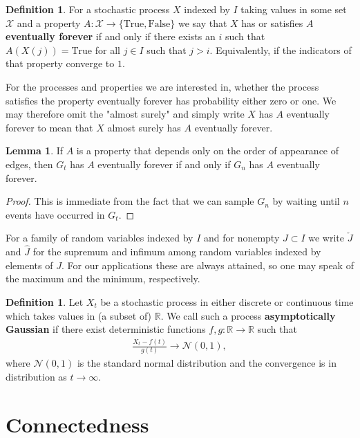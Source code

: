 \documentclass[12pt]{article}
\theoremstyle{definition}
\newtheorem{lemma}[proposition]{Lemma}
\newtheorem{definition}[proposition]{Definition}
\begin{document}
\begin{definition}
    For a stochastic process $X$ indexed by $I$ taking values in some set $\mathcal{X}$ and a property $A: \mathcal{X} \rightarrow \{\text{True},\text{False}\}$ we say that $X$ has or satisfies $A$ \textbf{eventually forever} if and only if there exists an $i$ such that $A(X(j)) = \text{True}$ for all $j \in I$ such that $j>i$. Equivalently, if the indicators of that property converge to $1$.
\end{definition}
For the processes and properties we are interested in, whether the process satisfies the property eventually forever has probability either zero or one. We may therefore omit the "almost surely" and simply write $X$ has $A$ eventually forever to mean that $X$ almost surely has $A$ eventually forever.
\begin{lemma}\label{De-Poissonization Lemma} If $A$ is a property that depends only on the order of appearance of edges, then $G_t$ has $A$ eventually forever if and only if $G_n$ has $A$ eventually forever.
\end{lemma} \begin{proof}
    This is immediate from the fact that we can sample $G_n$ by waiting until $n$ events have occurred in $G_t$.
\end{proof}

For a family of random variables indexed by $I$ and for nonempty $J \subset I$ we write $\check{J}$ and $\hat{J}$ for the supremum and infimum among random variables indexed by elements of $J$. For our applications these are always attained, so one may speak of the maximum and the minimum, respectively.

\begin{definition}\label{asymptotic gauss definition} Let $X_t$ be a stochastic process in either discrete or continuous time which takes values in (a subset of) $\mathbb{R}$. We call such a process \textbf{asymptotically Gaussian} if there exist deterministic functions $f,g: \mathbb{R} \to \mathbb{R}$ such that
    \begin{align*}
        \frac{X_t-f(t)}{g(t)} \rightarrow \mathcal{N}(0,1),
    \end{align*} where $\mathcal{N}(0,1)$ is the standard normal distribution and the convergence is in distribution as $t \rightarrow \infty$.
\end{definition}
\section{Connectedness}
\label{Connectedness}
\end{document}
